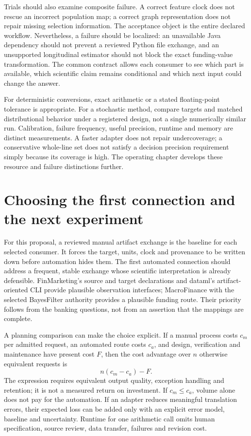 Trials should also examine composite failure. A correct feature clock does
not rescue an incorrect population map; a correct graph representation does
not repair missing selection information. The acceptance object is the entire
declared workflow. Nevertheless, a failure should be localized: an unavailable
Java dependency should not prevent a reviewed Python file exchange, and an
unsupported longitudinal estimator should not block the exact funding-value
transformation. The common contract allows each consumer to see which part
is available, which scientific claim remains conditional and which next
input could change the answer.

For deterministic conversions, exact arithmetic or a stated floating-point
tolerance is appropriate. For a stochastic method, compare targets and
matched distributional behavior under a registered design, not a single
numerically similar run. Calibration, failure frequency, useful precision,
runtime and memory are distinct measurements. A faster adapter does not
repair undercoverage; a conservative whole-line set does not satisfy a
decision precision requirement simply because its coverage is high. The
operating chapter develops these resource and failure distinctions further.

\section{Choosing the first connection and the next experiment}

For this proposal, a reviewed manual artifact exchange is the baseline for
each selected consumer. It forces the target, units, clock and provenance to
be written down before automation hides them. The first automated connection
should address a frequent, stable exchange whose scientific interpretation
is already defensible. FinMarketing's source and target declarations and
dataml's artifact-oriented CLI provide plausible observation interfaces;
MacroFinance with the selected BayesFilter authority provides a plausible
funding route. Their priority follows from the banking questions, not from
an assertion that the mappings are complete.

A planning comparison can make the choice explicit. If a manual process
costs $c_m$ per admitted request, an automated route costs $c_a$, and design,
verification and maintenance have present cost $F$, then the cost advantage
over $n$ otherwise equivalent requests is
\[
  n(c_m-c_a)-F.
\]
The expression requires equivalent output quality, exception handling and
retention; it is not a measured return on investment. If $c_m\leq c_a$,
volume alone does not pay for the automation. If an adapter reduces meaningful
translation errors, their expected loss can be added only with an explicit
error model, baseline and uncertainty. Runtime for one arithmetic call omits
human specification, source review, data transfer, failures and revision cost.

